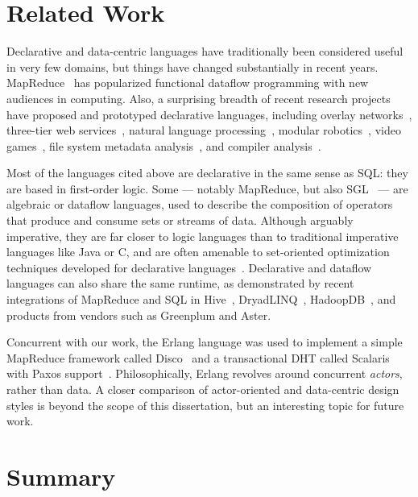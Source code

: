 \section{Related Work}
\label{ch:boom:sec:relwork}

Declarative and data-centric languages have traditionally been considered useful
in very few domains, but things have changed substantially in recent years.
MapReduce~\cite{mapreduce-osdi} has popularized functional dataflow programming
with new audiences in computing.  Also, a surprising breadth of recent research
projects have proposed and prototyped declarative languages, including overlay
networks~\cite{p2:sosp}, three-tier web services~\cite{hilda}, natural language
processing~\cite{dyna}, modular robotics~\cite{meld}, video games~\cite{cornellgames}, 
file system metadata analysis~\cite{wiscfsck}, and compiler analysis~\cite{bddbddb}.

Most of the languages cited above are declarative in the same sense as SQL: they are 
based in first-order logic. Some --- notably MapReduce, but also SGL~\cite{cornellgames} --- are
algebraic or dataflow languages, used to describe the composition of operators that produce and 
consume sets or streams of data.  Although arguably imperative, they are far closer to logic languages 
than to traditional imperative languages like Java or C, and are often amenable to set-oriented optimization 
techniques developed for declarative languages~\cite{cornellgames}. Declarative and dataflow languages 
can also share the same runtime, as demonstrated by recent integrations of MapReduce and SQL
in Hive~\cite{hive}, DryadLINQ~\cite{DryadLINQ}, HadoopDB~\cite{hadoopdb}, and products from vendors 
such as Greenplum and Aster.

Concurrent with our work, the Erlang language was used to implement a simple MapReduce framework called 
Disco~\cite{disco} and a transactional DHT called Scalaris with Paxos support~\cite{scalaris}. Philosophically, Erlang 
revolves around concurrent {\em actors}, rather than data. A closer comparison of actor-oriented and data-centric design 
styles is beyond the scope of this dissertation, but an interesting topic for future work.

\section{Summary}
\label{ch:boom:sec:conclusion}

